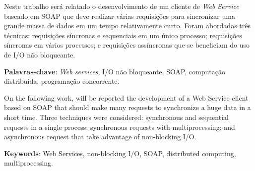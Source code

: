 %
%


Neste trabalho será relatado o desenvolvimento de um cliente de \textit{Web Service} baseado em SOAP que deve realizar várias requisições para sincronizar uma grande massa de dados em um tempo relativamente curto. Foram abordadas três técnicas: requisições síncronas e sequenciais em um único processo; requisições síncronas em vários processos; e requisições assíncronas que se beneficiam do uso de I/O não bloqueante.

\vspace{1.5ex}

{\bf Palavras-chave}: \textit{Web services}, I/O não bloqueante, SOAP, computação distribuída, programação concorrente.
%
%


On the following work, will be reported the development of a Web Service client based on SOAP that should make many requests to synchronize a huge data in a short time. Three techniques were considered: synchronous and sequential requests in a single process; synchronous requests with multiprocessing; and asynchronous request that take advantage of non-blocking I/O.

\vspace{1.5ex}

{\bf Keywords}: Web Services, non-blocking I/O, SOAP, distributed computing, multiprocessing.
